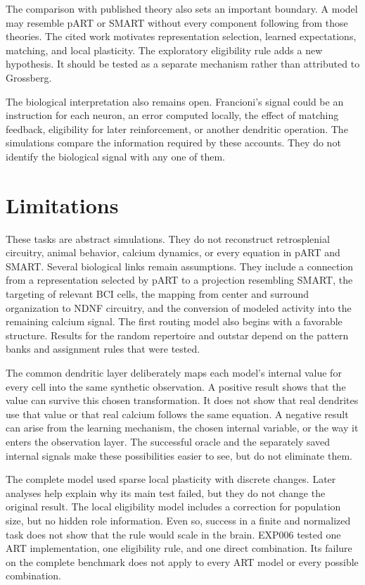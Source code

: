 \documentclass[11pt]{article}
\begin{document}
The comparison with published theory also sets an important boundary. A model may resemble pART or SMART without every component following from those theories. The cited work motivates representation selection, learned expectations, matching, and local plasticity. The exploratory eligibility rule adds a new hypothesis. It should be tested as a separate mechanism rather than attributed to Grossberg.

The biological interpretation also remains open. Francioni's signal could be an instruction for each neuron, an error computed locally, the effect of matching feedback, eligibility for later reinforcement, or another dendritic operation. The simulations compare the information required by these accounts. They do not identify the biological signal with any one of them.

\section{Limitations}
These tasks are abstract simulations. They do not reconstruct retrosplenial circuitry, animal behavior, calcium dynamics, or every equation in pART and SMART. Several biological links remain assumptions. They include a connection from a representation selected by pART to a projection resembling SMART, the targeting of relevant BCI cells, the mapping from center and surround organization to NDNF circuitry, and the conversion of modeled activity into the remaining calcium signal. The first routing model also begins with a favorable structure. Results for the random repertoire and outstar depend on the pattern banks and assignment rules that were tested.

The common dendritic layer deliberately maps each model's internal value for every cell into the same synthetic observation. A positive result shows that the value can survive this chosen transformation. It does not show that real dendrites use that value or that real calcium follows the same equation. A negative result can arise from the learning mechanism, the chosen internal variable, or the way it enters the observation layer. The successful oracle and the separately saved internal signals make these possibilities easier to see, but do not eliminate them.

The complete model used sparse local plasticity with discrete changes. Later analyses help explain why its main test failed, but they do not change the original result. The local eligibility model includes a correction for population size, but no hidden role information. Even so, success in a finite and normalized task does not show that the rule would scale in the brain. EXP006 tested one ART implementation, one eligibility rule, and one direct combination. Its failure on the complete benchmark does not apply to every ART model or every possible combination.
\end{document}
